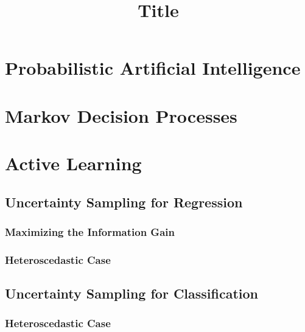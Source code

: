 \documentclass[
  fourColumns,
  landscape
]{formularyETH/formularyETH}
\title{Title}
\begin{document}
\section*{Probabilistic Artificial Intelligence}\label{sec:probabilistic_artificial_intelligence}
  \section{Markov Decision Processes}\label{sec:markov_decision_processes}
    
  \section{Active Learning}\label{sec:active_learning}
    
    \subsection{Uncertainty Sampling for Regression}\label{subsec:uncertainty_sampling_for_regression}
      \subsubsection{Maximizing the Information Gain}\label{subsubsec:maximizing_the_information_gain}
      
      \subsubsection{Heteroscedastic Case}\label{subsubsec:heteroscedastic_case}
      
    \subsection{Uncertainty Sampling for Classification}\label{subsec:uncertainty_sampling_for_classification}
      
      \subsubsection{Heteroscedastic Case}\label{subsubsec:heteroscedastic_case}
      
        \label{subsubsubsec:informative_sampling_for_classification}
        
\end{document}

